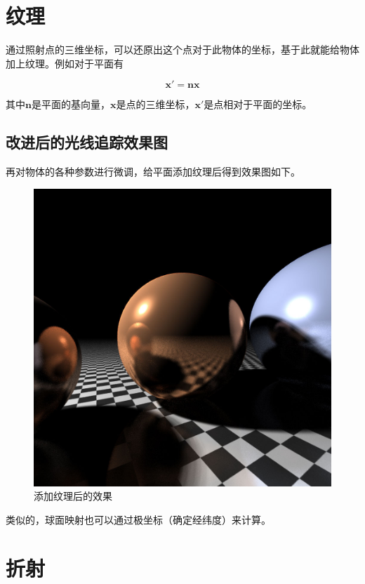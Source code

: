 \documentclass[10pt,twocolumn]{article}
\begin{document}
\section{\hei 纹理}
通过照射点的三维坐标，可以还原出这个点对于此物体的坐标，基于此就能给物体加上纹理。例如对于平面有

\begin{equation}
\mathbf{x'}=\mathbf{nx}
\end{equation}

其中$\mathbf{n}$是平面的基向量，$\mathbf{x}$是点的三维坐标，$\mathbf{x'}$是点相对于平面的坐标。

\subsection{\hei 改进后的光线追踪效果图}
再对物体的各种参数进行微调，给平面添加纹理后得到效果图如下。
\begin{figure}[ht]
\centering
\includegraphics[scale=.2]{fig9.jpg}
\caption{添加纹理后的效果}
\end{figure}

类似的，球面映射也可以通过极坐标（确定经纬度）来计算。

\section{\hei 折射}
\end{document}
